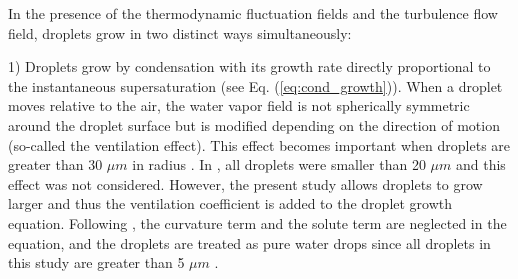 In the presence of the thermodynamic fluctuation fields and the turbulence flow field, droplets grow in two distinct ways simultaneously:

1) Droplets grow by condensation with its growth rate directly proportional to the instantaneous supersaturation (see Eq. (\ref{eq:cond_growth})). When a droplet moves relative to the air, the water vapor field is not spherically symmetric around the droplet surface but is modified depending on the direction of motion (so-called the ventilation effect). This effect becomes important when droplets are greater than 30 $\mu m$ in radius \citep{sedunov1974}. In \citet{Vaillancourt2001}, all droplets were smaller than 20 $\mu m$ and this effect was not considered. However, the present study allows droplets to grow larger and thus the ventilation coefficient is added to the droplet growth equation. Following \citet{Vaillancourt2001}, the curvature term and the solute term are neglected in the equation, and the droplets are treated as pure water drops since all droplets in this study are greater than 5 $\mu m$ \citep{Pruppacher1997}.

